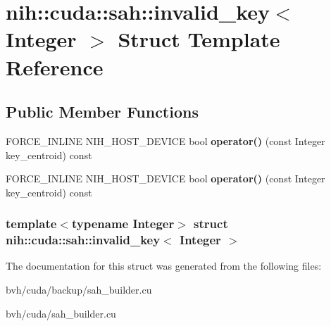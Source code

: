 \hypertarget{structnih_1_1cuda_1_1sah_1_1invalid__key}{
\section{nih\-:\-:cuda\-:\-:sah\-:\-:invalid\-\_\-key$<$ \-Integer $>$ \-Struct \-Template \-Reference}
\label{structnih_1_1cuda_1_1sah_1_1invalid__key}
}
\subsection*{\-Public \-Member \-Functions}
\begin{DoxyCompactItemize}
\item 
\hypertarget{structnih_1_1cuda_1_1sah_1_1invalid__key_a9f19d565a09df9a259495329197fff06}{
\-F\-O\-R\-C\-E\-\_\-\-I\-N\-L\-I\-N\-E \-N\-I\-H\-\_\-\-H\-O\-S\-T\-\_\-\-D\-E\-V\-I\-C\-E bool {\bfseries operator()} (const \-Integer key\-\_\-centroid) const }
\label{structnih_1_1cuda_1_1sah_1_1invalid__key_a9f19d565a09df9a259495329197fff06}

\item 
\hypertarget{structnih_1_1cuda_1_1sah_1_1invalid__key_a9f19d565a09df9a259495329197fff06}{
\-F\-O\-R\-C\-E\-\_\-\-I\-N\-L\-I\-N\-E \-N\-I\-H\-\_\-\-H\-O\-S\-T\-\_\-\-D\-E\-V\-I\-C\-E bool {\bfseries operator()} (const \-Integer key\-\_\-centroid) const }
\label{structnih_1_1cuda_1_1sah_1_1invalid__key_a9f19d565a09df9a259495329197fff06}

\end{DoxyCompactItemize}
\subsubsection*{template$<$typename Integer$>$ struct nih\-::cuda\-::sah\-::invalid\-\_\-key$<$ Integer $>$}



\-The documentation for this struct was generated from the following files\-:\begin{DoxyCompactItemize}
\item 
bvh/cuda/backup/sah\-\_\-builder.\-cu\item 
bvh/cuda/sah\-\_\-builder.\-cu\end{DoxyCompactItemize}
